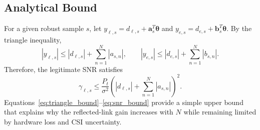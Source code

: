 \subsection{Analytical Bound}
For a given robust sample $s$, let $y_{\ell,s} = d_{\ell,s} + \mathbf{a}_{s}^{T}\boldsymbol{\theta}$ and $y_{e,s} = d_{e,s} + \mathbf{b}_{s}^{T}\boldsymbol{\theta}$.
By the triangle inequality,
\begin{equation}
|y_{\ell,s}| \le |d_{\ell,s}| + \sum_{n=1}^{N}|a_{s,n}|, \qquad |y_{e,s}| \le |d_{e,s}| + \sum_{n=1}^{N}|b_{s,n}|.
\label{eq:triangle_bound}
\end{equation}
Therefore, the legitimate SNR satisfies
\begin{equation}
\gamma_{\ell,s} \le \frac{P_t}{\sigma^2}\left(|d_{\ell,s}| + \sum_{n=1}^{N}|a_{s,n}|\right)^2.
\label{eq:snr_bound}
\end{equation}
Equations~\eqref{eq:triangle_bound}--\eqref{eq:snr_bound} provide a simple upper bound that explains why the reflected-link gain increases with $N$ while remaining limited by hardware loss and CSI uncertainty.
